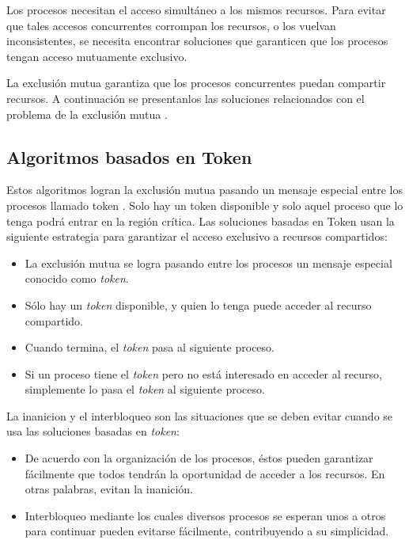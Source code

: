 	Los procesos necesitan el acceso simultáneo a los mismos recursos. Para  evitar que tales accesos concurrentes corrompan los recursos, o los vuelvan inconsistentes, se necesita encontrar soluciones que garanticen que los	procesos tengan acceso mutuamente exclusivo.
   
   La exclusión mutua garantiza que los procesos concurrentes   puedan compartir recursos. A continuaci\'on  se presentanlos las soluciones  relacionados con el problema de la exclusión mutua \cite{Wu1998} \cite{Czaja2018}.
 
\subsection{Algoritmos basados en Token}

Estos algoritmos logran la exclusión mutua pasando un mensaje especial entre los procesos llamado token \cite{Steen2017}. Solo hay un token disponible y solo aquel proceso que lo tenga podrá entrar en la región crítica.
 Las soluciones basadas en Token usan la siguiente estrategia para garantizar el acceso exclusivo a recursos compartidos:
	\begin{itemize} 
		\item La exclusión mutua se logra pasando entre los procesos un mensaje especial conocido como \textit{token}. 
		\item Sólo hay un \textit{token} disponible, y quien lo tenga puede acceder al recurso compartido.
		\item  Cuando termina, el \textit{token} pasa al siguiente proceso. 
		\item Si un proceso 	tiene el \textit{token} pero no está interesado en acceder al recurso, simplemente lo pasa el \textit{token} al siguiente proceso.
		
	\end{itemize}
 
 
 La \gls{inanicion} y el \gls{interbloqueo} son las situaciones que se deben  evitar cuando se usa  las soluciones basadas en \textit{token}:
	\begin{itemize} 
		\item De acuerdo con la organización de los procesos, éstos pueden garantizar fácilmente que todos tendrán la oportunidad de acceder a los recursos. En otras palabras, evitan la inanición.
		\item  Interbloqueo mediante los cuales diversos procesos se esperan unos a otros para continuar pueden evitarse fácilmente, 	contribuyendo a su simplicidad. 
		
	\end{itemize}
 

